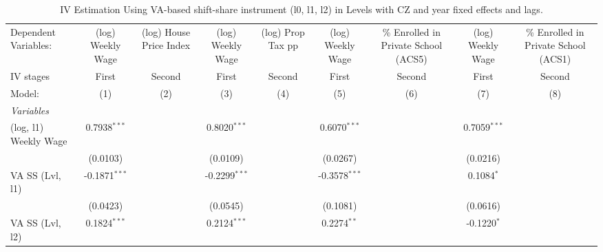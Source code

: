 \documentclass[
  10pt,
]{article}
\begin{document}
\begin{table}[htbp]
   \caption{\label{tbl_va_ss_prop_priv_school} IV Estimation Using VA-based shift-share instrument (l0, l1, l2) in Levels with CZ and year fixed effects and lags.}
   \centering
   \begin{adjustbox}{max width=\linewidth}
      \begin{tabular}{lcccccccc}
         \tabularnewline \midrule \midrule
         Dependent Variables:                           & (log) Weekly Wage   & (log) House Price Index & (log) Weekly Wage   & (log) Prop Tax pp     & (log) Weekly Wage      & \% Enrolled in Private School (ACS5)  & (log) Weekly Wage      & \% Enrolled in Private School (ACS1)\\   
         IV stages                                      & First               & Second                  & First               & Second                & First                  & Second                                & First                  & Second \\   
         Model:                                         & (1)                 & (2)                     & (3)                 & (4)                   & (5)                    & (6)                                   & (7)                    & (8)\\  
         \midrule
         \emph{Variables}\\
         (log, l1) Weekly Wage                          & 0.7938$^{***}$      &                         & 0.8020$^{***}$      &                       & 0.6070$^{***}$         &                                       & 0.7059$^{***}$         &   \\   
                                                        & (0.0103)            &                         & (0.0109)            &                       & (0.0267)               &                                       & (0.0216)               &   \\   
         VA SS (Lvl, l1)                                & -0.1871$^{***}$     &                         & -0.2299$^{***}$     &                       & -0.3578$^{***}$        &                                       & 0.1084$^{*}$           &   \\   
                                                        & (0.0423)            &                         & (0.0545)            &                       & (0.1081)               &                                       & (0.0616)               &   \\   
         VA SS (Lvl, l2)                                & 0.1824$^{***}$      &                         & 0.2124$^{***}$      &                       & 0.2274$^{**}$          &                                       & -0.1220$^{*}$          &   \\   

\end{tabular}
\end{adjustbox}
\end{table}
\end{document}
